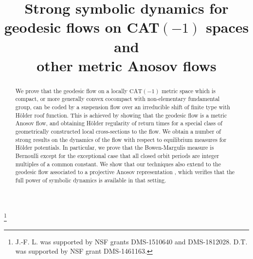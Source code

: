 \documentclass[JEP,XML,SOM,Unicode,NoFloatCountersInSection]{cedram}
\theoremstyle{definition}
\numberwithin{equation}{section}
\begin{document}
\frontmatter
\title[Strong symbolic dynamics for metric Anosov flows]{Strong symbolic dynamics for\\ geodesic flows on CAT$(-1)$ spaces and\\ other metric Anosov flows}

\author[\initial{D.} \lastname{Constantine}]{ }
\address{Wesleyan University,
Mathematics and Computer Science Department\\
Middletown, CT 06459}

\author[\initial{J.-F.} \lastname{Lafont}]{ }
\address{Department of Mathematics,
Ohio State University\\
Columbus, Ohio 43210}

\author[\initial{D.} \middlename{J.} \lastname{Thompson}]{\nobreakauthor {}\nobreakauthor {}}
\address{Department of Mathematics,
Ohio State University\\
Columbus, Ohio 43210}

\thanks{J.-F. L. was supported by NSF grants DMS-1510640 and DMS-1812028. D.T. was supported by NSF grant DMS-1461163.}

\begin{abstract}
We prove that the geodesic flow on a locally $\mathrm{CAT}(-1)$ metric space which is compact, or more generally convex cocompact with non-elementary fundamental group, can be coded by a suspension flow over an irreducible shift of finite type with Hölder roof function. This is achieved by showing that the geodesic flow is a metric Anosov flow, and obtaining Hölder regularity of return times for a special class of geometrically constructed local cross-sections to the flow. We obtain a number of strong results on the dynamics of the flow with respect to equilibrium measures for Hölder potentials. In particular, we prove that the Bowen-Margulis measure is Bernoulli except for the exceptional case that all closed orbit periods are integer multiples of a common constant. We show that our techniques also extend to the geodesic flow associated to a projective Anosov representation \cite{bcls}, which verifies that the full power of symbolic dynamics is available in that setting.
\end{abstract}
\end{document}
